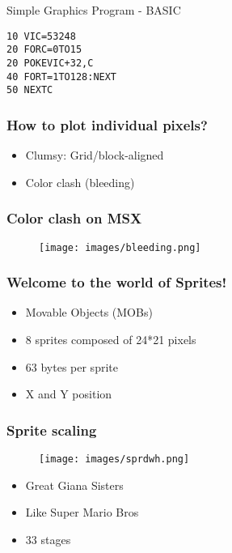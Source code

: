 
\begin{frame}[fragile]{Simple Graphics Program - BASIC}

\begin{lstlisting}
10 VIC=53248
20 FORC=0TO15
20 POKEVIC+32,C
40 FORT=1TO128:NEXT
50 NEXTC
\end{lstlisting}

\end{frame}


\begin{frame}
\frametitle{How to plot individual pixels?}

\begin{itemize}
\item Clumsy: Grid/block-aligned
\item Color clash (bleeding)
\end{itemize}

\end{frame}


\begin{frame}
\frametitle{Color clash on MSX}

\begin{figure}
\texttt{[image: images/bleeding.png]}
\end{figure}

\end{frame}


\begin{frame}
\frametitle{Welcome to the world of Sprites!}

\begin{itemize}
\item Movable Objects (MOBs)
\item 8 sprites composed of 24*21 pixels
\item 63 bytes per sprite
\item X and Y position
\end{itemize}

\end{frame}


\begin{frame}
\frametitle{Sprite scaling}

\begin{figure}
\texttt{[image: images/sprdwh.png]}
\end{figure}

\begin{itemize}
\item Great Giana Sisters
\item Like Super Mario Bros
\item 33 stages
\end{itemize}

\end{frame}

